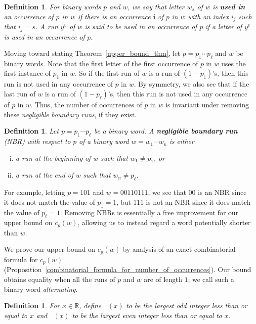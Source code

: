 \documentclass[11pt]{amsart}
\newtheorem{definition}[theorem]{Definition}
\newcommand{\RR}{\mathbb{R}}
\DeclareMathOperator{\oddleq}{\mathcal{O}_{\leq}}
\DeclareMathOperator{\evenleq}{\mathcal{E}_{\leq}}
\begin{document}
\begin{definition}
    For binary words $p$ and $w$, we say that letter $w_s$ of $w$ is \textbf{used in} an occurrence of $p$ in $w$ if there is an occurrence $\mathbf{i}$ of $p$ in $w$ with an index $i_j$ such that ${i_j}=s$. A run $y^v$ of $w$ is said to be used in an occurrence of $p$ if a letter of $y^v$ is used in an occurrence of $p$.
\end{definition}

Moving toward stating Theorem~\ref{upper_bound_thm}, let $p=p_1\cdots p_{\ell}$ and $w$ be binary words. Note that the first letter of the first occurrence of $p$ in $w$ uses the first instance of $p_1$ in $w$. So if the first run of $w$ is a run of $(1-p_1)$'s, then this run is not used in any occurrence of $p$ in $w$. By symmetry, we also see that if the last run of $w$ is a run of $(1-p_{\ell})$'s, then this run is not used in any occurrence of $p$ in $w$. Thus, the number of occurrences of $p$ in $w$ is invariant under removing these \emph{negligible boundary runs}, if they exist.

\begin{definition}
    Let $p=p_1\cdots p_{\ell}$ be a binary word. A \textbf{negligible boundary run} (NBR) with respect to $p$ of a binary word $w=w_1\cdots w_n$ is either
    \begin{enumerate}[(i)]
        \item a run at the beginning of $w$ such that $w_1\neq p_1$, or
        \item a run at the end of $w$ such that $w_n\neq p_{\ell}$.
    \end{enumerate}
\end{definition}

For example, letting $p=101$ and $w=00110111$, we see that $00$ is an NBR since it does not match the value of $p_1=1$, but $111$ is not an NBR since it does match the value of $p_{\ell}=1$. Removing NBRs is essentially a free improvement for our upper bound on $c_p(w)$, allowing us to instead regard a word potentially shorter than $w$. 

We prove our upper bound on $c_p(w)$ by analysis of an exact combinatorial formula for $c_p(w)$ (Proposition~\ref{combinatorial_formula_for_number_of_occurrences}). Our bound obtains equality when all the runs of $p$ and $w$ are of length $1$; we call such a binary word \emph{alternating}.

\begin{definition}
    For $x\in\RR$, define $\oddleq(x)$ to be the largest odd integer less than or equal to $x$ and $\evenleq(x)$ to be the largest even integer less than or equal to $x$.
\end{definition}
\end{document}

